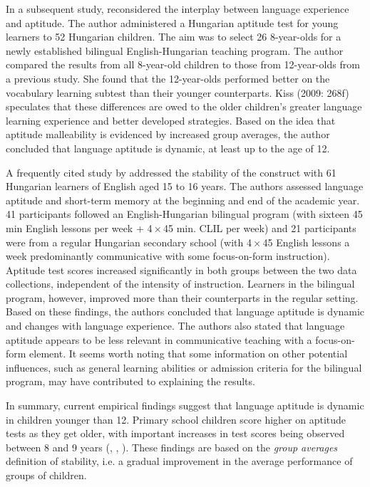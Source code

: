 \documentclass[output=paper]{langsci/langscibook}
\begin{document}
In a subsequent study, \citet{Kiss2009} reconsidered the interplay between language experience and aptitude. The author administered a Hungarian aptitude test for young learners to 52 Hungarian children. The aim was to select 26 8-year-olds for a newly established bilingual English-Hungarian teaching program. The author compared the results from all 8-year-old children to those from 12-year-olds from a previous study. She found that the 12-year-olds performed better on the vocabulary learning subtest than their younger counterparts. Kiss (2009: 268f) speculates that these differences are owed to the older children’s greater language learning experience and better developed strategies. Based on the idea that aptitude malleability is evidenced by increased group averages, the author concluded that language aptitude is dynamic, at least up to the age of 12. 

A frequently cited study by \citet{SafarKormos2008} addressed the stability of the construct with 61 Hungarian learners of English aged 15 to 16 years. The authors assessed language aptitude and short-term memory at the beginning and end of the academic year. 41 participants followed an English-Hungarian bilingual program (with sixteen 45 min English lessons per week + 4\,×\,45 min. CLIL per week) and 21 participants were from a regular Hungarian secondary school (with 4\,×\,45 English lessons a week predominantly communicative with some focus-on-form instruction). Aptitude test scores increased significantly in both groups between the two data collections, independent of the intensity of instruction. Learners in the bilingual program, however, improved more than their counterparts in the regular setting. Based on these findings, the authors concluded that language aptitude is dynamic and changes with language experience. The authors also stated that language aptitude appears to be less relevant in communicative teaching with a focus-on-form element. It seems worth noting that some information on other potential influences, such as general learning abilities or admission criteria for the bilingual program, may have contributed to explaining the results. 

In summary, current empirical findings suggest that language aptitude is dynamic in children younger than 12. Primary school children score higher on aptitude tests as they get older, with important increases in test scores being observed between 8 and 9 years (\citealt{MiltonAlexiou2006}, \citealt{Kiss2009}, \citealt{SuarezMunoz2011}). These findings are based on the \textit{group averages} definition of stability, i.e. a gradual improvement in the average performance of groups of children. 
\end{document}
